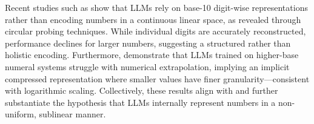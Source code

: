 




Recent studies such as \citet{levy2024language, zhou2024scaling} show that LLMs rely on base-10 digit-wise representations rather than encoding numbers in a continuous linear space, as revealed through circular probing techniques. While individual digits are accurately reconstructed, performance declines for larger numbers, suggesting a structured rather than holistic encoding. Furthermore, \citet{zhou2024scaling} demonstrate that LLMs trained on higher-base numeral systems struggle with numerical extrapolation, implying an implicit compressed representation where smaller values have finer granularity—consistent with logarithmic scaling. Collectively, these results align with and further substantiate the hypothesis that LLMs internally represent numbers in a non-uniform, sublinear manner.


